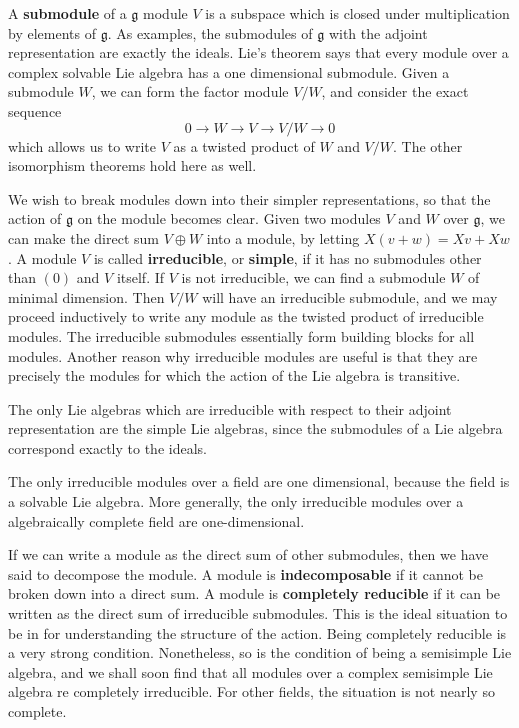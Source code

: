 A {\bf submodule} of a $\mathfrak{g}$ module $V$ is a subspace which is closed under multiplication by elements of $\mathfrak{g}$. As examples, the submodules of $\mathfrak{g}$ with the adjoint representation are exactly the ideals. Lie's theorem says that every module over a complex solvable Lie algebra has a one dimensional submodule. Given a submodule $W$, we can form the factor module $V/W$, and consider the exact sequence
%
\[ 0 \to W \to V \to V/W \to 0 \]
%
which allows us to write $V$ as a twisted product of $W$ and $V/W$. The other isomorphism theorems hold here as well.

We wish to break modules down into their simpler representations, so that the action of $\mathfrak{g}$ on the module becomes clear. Given two modules $V$ and $W$ over $\mathfrak{g}$, we can make the direct sum $V \oplus W$ into a module, by letting $X(v + w) = Xv + Xw$. A module $V$ is called {\bf irreducible}, or {\bf simple}, if it has no submodules other than $(0)$ and $V$ itself. If $V$ is not irreducible, we can find a submodule $W$ of minimal dimension. Then $V/W$ will have an irreducible submodule, and we may proceed inductively to write any module as the twisted product of irreducible modules. The irreducible submodules essentially form building blocks for all modules. Another reason why irreducible modules are useful is that they are precisely the modules for which the action of the Lie algebra is transitive.

\begin{example}
    The only Lie algebras which are irreducible with respect to their adjoint representation are the simple Lie algebras, since the submodules of a Lie algebra correspond exactly to the ideals.
\end{example}

\begin{example}
    The only irreducible modules over a field are one dimensional, because the field is a solvable Lie algebra. More generally, the only irreducible modules over a algebraically complete field are one-dimensional.
\end{example}

If we can write a module as the direct sum of other submodules, then we have said to decompose the module. A module is {\bf indecomposable} if it cannot be broken down into a direct sum. A module is {\bf completely reducible} if it can be written as the direct sum of irreducible submodules. This is the ideal situation to be in for understanding the structure of the action. Being completely reducible is a very strong condition. Nonetheless, so is the condition of being a semisimple Lie algebra, and we shall soon find that all modules over a complex semisimple Lie algebra re completely irreducible. For other fields, the situation is not nearly so complete.

